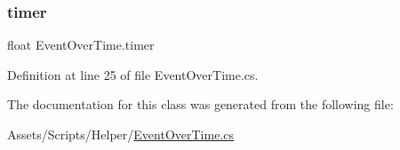 \mbox{\label{class_event_over_time_a9664ec36e8634d7019f04d223be4a056}} 
\subsubsection{\texorpdfstring{timer}{timer}}
{\footnotesize\ttfamily float Event\+Over\+Time.\+timer}



Definition at line 25 of file Event\+Over\+Time.\+cs.



The documentation for this class was generated from the following file\+:\begin{DoxyCompactItemize}
\item 
Assets/\+Scripts/\+Helper/\mbox{\hyperlink{_event_over_time_8cs}{Event\+Over\+Time.\+cs}}\end{DoxyCompactItemize}
